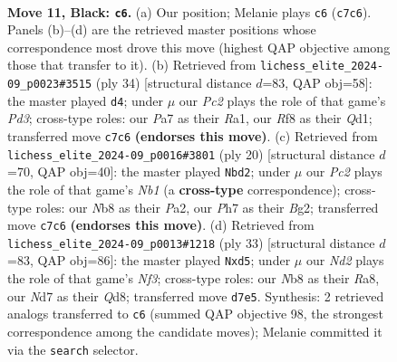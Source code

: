 \documentclass[11pt]{article}
\begin{document}
\clearpage

\begin{figure}[p]\centering
\begin{subfigure}{0.46\textwidth}\centering
\resizebox{\linewidth}{!}{%
\newchessgame
\chessboard[
  setfen={rnbq1rk1/pppn1ppp/4p3/3pP3/3P1P2/2N2Q2/PPP3PP/2R1KBNR b K - 8 11},
  showmover=false,
  pgfstyle=straightmove, color=movearrow, markmove={c7-c6}
]}
\caption{}
\end{subfigure}\hfill
\begin{subfigure}{0.46\textwidth}\centering
\resizebox{\linewidth}{!}{%
\newchessgame
\chessboard[
  setfen={r3r1k1/1pqn1pp1/n1p1b3/p2pP2p/8/PP1P1NPP/2P1N1B1/R2Q1RK1 w - - 1 18},
  showmover=false,
  pgfstyle=straightmove, color=movearrow, markmove={d3-d4}
]}
\caption{}
\end{subfigure}
\\[4pt]
\begin{subfigure}{0.46\textwidth}\centering
\resizebox{\linewidth}{!}{%
\newchessgame
\chessboard[
  setfen={r1b1k2r/pp3pp1/2nqpn1p/8/2Pp4/3P1NP1/PP3PBP/RN1Q1RK1 w kq - 0 11},
  showmover=false,
  pgfstyle=straightmove, color=movearrow, markmove={b1-d2}
]}
\caption{}
\end{subfigure}\hfill
\begin{subfigure}{0.46\textwidth}\centering
\resizebox{\linewidth}{!}{%
\newchessgame
\chessboard[
  setfen={r2qrn2/ppp2pk1/5np1/3P1b2/1P1Pp3/2N1P1PP/PQ1NB3/R3K2R b KQ - 0 17},
  showmover=false,
  pgfstyle=straightmove, color=movearrow, markmove={f6-d5}
]}
\caption{}
\end{subfigure}
\caption{\textbf{Move 11, Black: \texttt{c6}.} (a) Our position; Melanie plays \texttt{c6} (\texttt{c7c6}). Panels (b)--(d) are the retrieved master positions whose correspondence most drove this move (highest QAP objective among those that transfer to it). (b) Retrieved from \texttt{lichess\_elite\_2024-09\_p0023\#3515} (ply 34) [structural distance $d$=83, QAP obj=58]: the master played \texttt{d4}; under $\mu$ our \emph{Pc2} plays the role of that game's \emph{Pd3}; cross-type roles: our \emph{P}a7 as their \emph{R}a1, our \emph{R}f8 as their \emph{Q}d1; transferred move \texttt{c7c6} \textbf{(endorses this move)}. (c) Retrieved from \texttt{lichess\_elite\_2024-09\_p0016\#3801} (ply 20) [structural distance $d$=70, QAP obj=40]: the master played \texttt{Nbd2}; under $\mu$ our \emph{Pc2} plays the role of that game's \emph{Nb1} (a \textbf{cross-type} correspondence); cross-type roles: our \emph{N}b8 as their \emph{P}a2, our \emph{P}h7 as their \emph{B}g2; transferred move \texttt{c7c6} \textbf{(endorses this move)}. (d) Retrieved from \texttt{lichess\_elite\_2024-09\_p0013\#1218} (ply 33) [structural distance $d$=83, QAP obj=86]: the master played \texttt{Nxd5}; under $\mu$ our \emph{Nd2} plays the role of that game's \emph{Nf3}; cross-type roles: our \emph{N}b8 as their \emph{R}a8, our \emph{N}d7 as their \emph{Q}d8; transferred move \texttt{d7e5}. Synthesis: 2 retrieved analogs transferred to \texttt{c6} (summed QAP objective 98, the strongest correspondence among the candidate moves); Melanie committed it via the \texttt{search} selector.}
\label{fig:thought-m21}
\end{figure}
\end{document}
